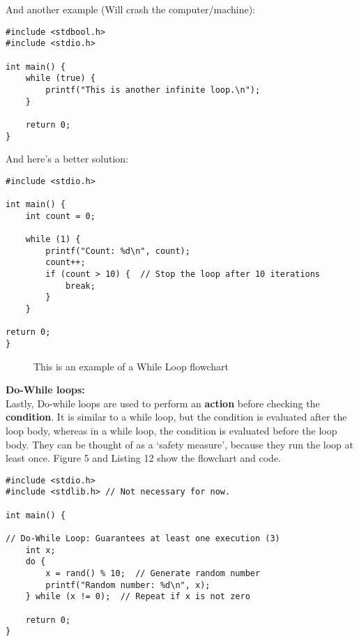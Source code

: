 \documentclass[a4paper,12pt]{article}
\begin{document}
And another example (Will crash the computer/machine):

\lstset{language=C}
\begin{lstlisting}[caption=Infinite loop with Boolean values]
#include <stdbool.h>
#include <stdio.h>

int main() {
    while (true) {
        printf("This is another infinite loop.\n");
    }

    return 0;
}\end{lstlisting}

And here's a better solution:

\lstset{language=C}
\begin{lstlisting}[caption=Good use of while loop]
#include <stdio.h>

int main() {
    int count = 0;

    while (1) {
        printf("Count: %d\n", count);
        count++;
        if (count > 10) {  // Stop the loop after 10 iterations
            break;
        }
    }

return 0;
}\end{lstlisting}

\begin{figure}[H]
\centering
{}
    \caption{This is an example of a While Loop flowchart}
    \label{fig:While}
\end{figure}

\vspace{1cm}

\textbf{Do-While loops:}\\
Lastly, Do-while loops are used to perform an \textbf{action} before checking the \textbf{condition}. It is similar to a while loop, but the condition is evaluated after the loop body, whereas in a while loop, the condition is evaluated before the loop body. They can be thought of as a `safety measure', because they run the loop at least once. Figure 5 and Listing 12 show the flowchart and code.
\begin{lstlisting}[caption=Do-while loop]
#include <stdio.h>
#include <stdlib.h> // Not necessary for now.

int main() {

// Do-While Loop: Guarantees at least one execution (3)
    int x;
    do {
        x = rand() % 10;  // Generate random number
        printf("Random number: %d\n", x);
    } while (x != 0);  // Repeat if x is not zero

    return 0;
}\end{lstlisting}
\end{document}
